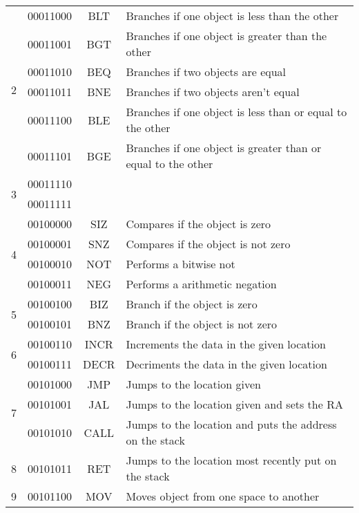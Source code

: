 \documentclass[12pt]{article}
\begin{document}
\begin{tabular}{| r | r | c | l |}
\hline
\multirow{6}{*}{2} & 00011000 & BLT & Branches if one object is less than the other\\
& 00011001 & BGT & Branches if one object is greater than the other\\
& 00011010 & BEQ & Branches if two objects are equal\\
& 00011011 & BNE & Branches if two objects aren't equal\\
& 00011100 & BLE & Branches if one object is less than or equal to the other\\
& 00011101 & BGE & Branches if one object is greater than or equal to the other\\
\hline
\multirow{2}{*}{3} & 00011110 & &\\
& 00011111 & &\\
\hline
\multirow{4}{*}{4} & 00100000 & SIZ & Compares if the object is zero\\
& 00100001 & SNZ & Compares if the object is not zero\\
& 00100010 & NOT & Performs a bitwise not\\
& 00100011 & NEG & Performs a arithmetic negation\\
\hline
\multirow{2}{*}{5} & 00100100 & BIZ & Branch if the object is zero\\
& 00100101 & BNZ & Branch if the object is not zero\\
\hline
\multirow{2}{*}{6} & 00100110 & INCR & Increments the data in the given location\\
& 00100111 & DECR & Decriments the data in the given location\\
\hline
\multirow{3}{*}{7} & 00101000 & JMP & Jumps to the location given\\
& 00101001 & JAL & Jumps to the location given and sets the RA\\
& 00101010 & CALL & Jumps to the location and puts the address on the stack\\
\hline
8 & 00101011 & RET & Jumps to the location most recently put on the stack\\
\hline
9 & 00101100 & MOV & Moves object from one space to another\\
\hline
\end{tabular}
\end{document}
